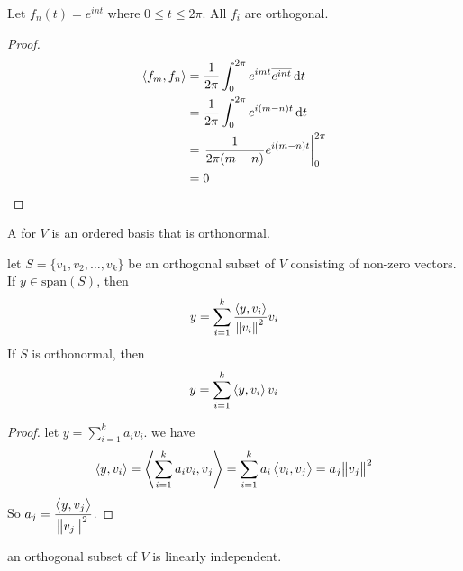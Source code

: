 \begin{theorem}
    Let $f_n (t) = e^{i nt}$ where $0 \leq t \leq 2 \pi$. All $f_i$ are orthogonal.
\end{theorem}
\begin{proof}
    \begin{equation}
        \begin{aligned}
            \innerproduct{f_m}{f_n} &= \frac{1}{2 \pi} \int_0^{2 \pi} e^{imt} \overline{e^{int}} \dif{t} \\
            &= \frac{1}{2\pi} \int_0^{2\pi} e^{i (m-n) t} \dif{t} \\
            &= \left. \frac{1}{2\pi (m-n)} e^{i(m-n)t} \right|_0^{2\pi} \\
            &= 0
        \end{aligned}
    \end{equation}
\end{proof}



\begin{definition}
	A  for $V$ is an ordered basis that is orthonormal.
\end{definition}

\begin{theorem}
	let $S=\{ v_1, v_2, \dots, v_k \}$ be an orthogonal subset of $V$ consisting of non-zero vectors. If $y \in \text{span}(S)$, then
	\begin{equation}
		y = \sum_{i=1}^k \frac{\left\langle \displaystyle y, v_i \right\rangle}{\norm{v_i}^2} v_i
	\end{equation}
	If $S$ is orthonormal, then
	\begin{equation}
		y = \sum_{i=1}^k \left\langle \displaystyle y, v_i \right\rangle v_i
	\end{equation}
\end{theorem}
\begin{proof}
	let $\displaystyle y = \sum_{i=1}^k a_i v_i$. we have
	\begin{equation*}
		\left\langle \displaystyle y, v_i \right\rangle = \left\langle \displaystyle \sum_{i=1}^k a_i v_i, v_j \right\rangle = \sum_{i=1}^k a_i \left\langle \displaystyle v_i, v_j \right\rangle = a_j \norm{v_j}^2
	\end{equation*}
	So $\displaystyle a_j = \frac{\left\langle \displaystyle y, v_j \right\rangle}{\norm{v_j}^2}$.
	
	
\end{proof}

\begin{theorem}
	an orthogonal subset of $V$ is linearly independent.
\end{theorem}

